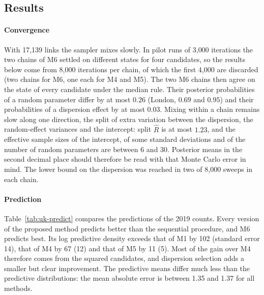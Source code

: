 \subsection{Results}

\paragraph{Convergence} With 17{,}139 links the sampler mixes slowly. In pilot runs of 3{,}000 iterations the two chains of M6 settled on different states for four candidates, so the results below come from 8{,}000 iterations per chain, of which the first 4{,}000 are discarded (two chains for M6, one each for M4 and M5). The two M6 chains then agree on the state of every candidate under the median rule. Their posterior probabilities of a random parameter differ by at most $0.26$ (London, $0.69$ and $0.95$) and their probabilities of a dispersion effect by at most $0.03$. Mixing within a chain remains slow along one direction, the split of extra variation between the dispersion, the random-effect variances and the intercept: split $\hat R$ is at most $1.23$, and the effective sample sizes of the intercept, of some standard deviations and of the number of random parameters are between 6 and 30. Posterior means in the second decimal place should therefore be read with that Monte Carlo error in mind. The lower bound on the dispersion was reached in two of 8{,}000 sweeps in each chain.

\paragraph{Prediction} Table~\ref{tab:uk-predict} compares the predictions of the 2019 counts. Every version of the proposed method predicts better than the sequential procedure, and M6 predicts best. Its log predictive density exceeds that of M1 by 102 (standard error 14), that of M4 by 67 (12) and that of M5 by 11 (5). Most of the gain over M4 therefore comes from the squared candidates, and dispersion selection adds a smaller but clear improvement. The predictive means differ much less than the predictive distributions: the mean absolute error is between 1.35 and 1.37 for all methods.

